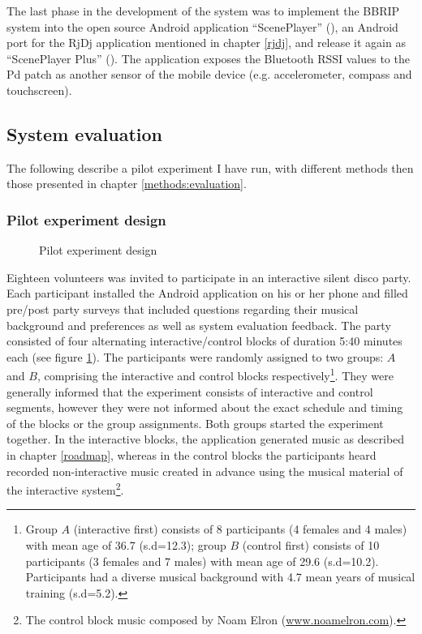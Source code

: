 \documentclass[a4paper,11pt]{article}
\begin{document}
{The last phase in the development of the system was to implement the BBRIP system into the open source Android application ``ScenePlayer'' (\cite{web:sceneplayer}), an Android port for the RjDj application mentioned in chapter \ref{rjdj}, and release it again as ``ScenePlayer Plus'' (\cite{web:sceneplayerplus}).
The application exposes the Bluetooth RSSI values to the Pd patch as another sensor of the mobile device (e.g. accelerometer, compass and touchscreen).

\subsection{System evaluation}

The following describe a pilot experiment I have run, with different methods then those presented in chapter \ref{methods:evaluation}.

\subsubsection{Pilot experiment design}

\begin{figure}[!htb]
	\centering
	\def\svgwidth{0.95\columnwidth}
  	
	\caption{Pilot experiment design}\label{fig:pilot}
\end{figure}

Eighteen volunteers was invited to participate in an interactive silent disco party.
Each participant installed the Android application on his or her phone and filled pre/post party surveys that included questions regarding their musical background and preferences as well as system evaluation feedback.
The party consisted of four alternating interactive/control blocks of duration 5:40 minutes each (see figure \ref{fig:pilot}).
The participants were randomly assigned to two groups: $A$ and $B$, comprising the interactive and control blocks respectively\footnote{Group $A$ (interactive first) consists of 8 participants (4 females and 4 males) with mean age of 36.7 (s.d=12.3); group $B$ (control first) consists of 10 participants (3 females and 7 males) with mean age of 29.6 (s.d=10.2). Participants had a diverse musical background with 4.7 mean years of musical training (s.d=5.2).}.
They were generally informed that the experiment consists of interactive and control segments, however they were not informed about the exact schedule and timing of the blocks or the group assignments.
Both groups started the experiment together.
In the interactive blocks, the application generated music as described in chapter \ref{roadmap}, whereas in the control blocks the participants heard recorded non-interactive music created in advance using the musical material of the interactive system\footnote{The control block music composed by Noam Elron (\href{http://www.noamelron.com}{www.noamelron.com}).}.

}
\end{document}
